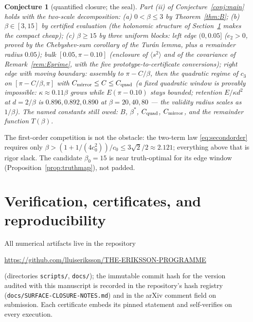 \documentclass[11pt]{article}
\newtheorem{conjecture}[theorem]{Conjecture}
\theoremstyle{remark}
\begin{document}
\begin{conjecture}[quantified closure; the seal]\label{conj:seal}
Part \textup{(ii)} of Conjecture~\ref{conj:main} holds with the two-scale
decomposition: \textup{(a)} $0<\beta\le3$ by Theorem~\ref{thm:B};
\textup{(b)} $\beta\in[3,15]$ by certified evaluation \textup{(the
holonomic structure of Section~\ref{sec:verif} makes the compact cheap)};
\textup{(c)} $\beta\ge15$ by three uniform blocks: left edge $(0,0.05]$
\textup{(}$e_2>0$, proved by the Chebyshev-sum corollary of the
Tur\'an lemma, plus a remainder radius $0.05$\textup{)}; bulk
$[0.05,\pi-0.10]$ \textup{(}enclosure of $\langle s^2\rangle$ and of the
covariance of Remark~\ref{rem:Eprime}, with the five
prototype-to-certificate conversions\textup{)}; right edge with
\emph{moving} boundary: assembly to $\pi-C/\beta$, then the quadratic
regime of $c_3$ on $[\pi-C/\beta,\pi]$ with $C_{\rm mirror}\le C\le
C_{\rm quad}$ \textup{(}a fixed quadratic window is provably impossible:
$\kappa\approx0.11\beta$ grows while $E(\pi-0.10)$ stays bounded;
retention $E/\kappa d^2$ at $d=2/\beta$ is $0.896,0.892,0.890$ at
$\beta=20,40,80$ --- the validity radius scales as $1/\beta$\textup{)}.
The named constants still owed: $B$, $\beta^*$, $C_{\rm quad}$,
$C_{\rm mirror}$, and the remainder function $T(\beta)$.
\end{conjecture}

The first-order competition is not the obstacle: the two-term law
\eqref{eq:secondorder} requires only
$\beta>(1+1/(4c_0^2))/c_0\le3\sqrt2/2\approx2.121$; everything above that
is rigor slack. The candidate $\beta_0=15$ is near truth-optimal for its
edge window (Proposition~\ref{prop:truthmap}), not padded.

\section{Verification, certificates, and reproducibility}\label{sec:verif}

All numerical artifacts live in the repository
\begin{center}
\url{https://github.com/lluiseriksson/THE-ERIKSSON-PROGRAMME}
\end{center}
(directories \texttt{scripts/}, \texttt{docs/}); the immutable commit
hash for the version audited with this manuscript is recorded in the
repository's hash registry (\texttt{docs/SURFACE-CLOSURE-NOTES.md}) and
in the arXiv comment field on submission. Each certificate embeds its
pinned statement and self-verifies on every execution.
\end{document}
